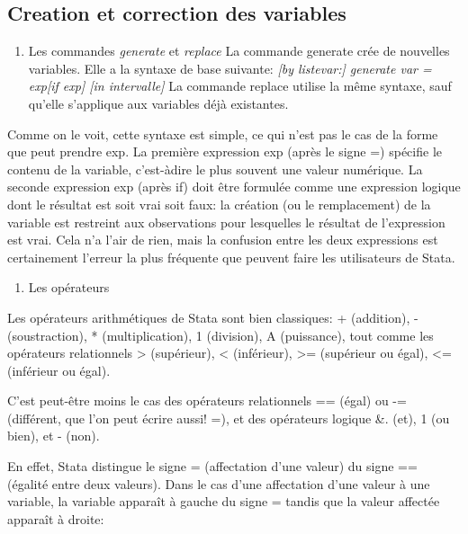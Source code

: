 \documentclass[
]{book}
\providecommand{\tightlist}{%
  \setlength{\itemsep}{0pt}\setlength{\parskip}{0pt}}
\begin{document}
\hypertarget{creation-et-correction-des-variables}{%
\subsection{Creation et correction des variables}\label{creation-et-correction-des-variables}}

\begin{enumerate}
\def\labelenumi{(\arabic{enumi})}
\tightlist
\item
  Les commandes \emph{generate} et \emph{replace}
  La commande generate crée de nouvelles variables. Elle a la syntaxe de base suivante:
  \emph{{[}by listevar:{]} generate var = exp{[}if exp{]} {[}in intervalle{]}}
  La commande replace utilise la même syntaxe, sauf qu'elle s'applique aux variables déjà existantes.
\end{enumerate}

Comme on le voit, cette syntaxe est simple, ce qui n'est pas le cas de la forme que peut prendre exp. La première expression exp (après le signe =) spécifie le contenu de la variable, c'est-àdire le plus souvent une valeur numérique. La seconde expression exp (après if) doit être formulée comme une expression logique dont le résultat est soit vrai soit faux: la création (ou le remplacement) de la variable est restreint aux observations pour lesquelles le résultat de l'expression est vrai. Cela n'a l'air de rien, mais la confusion entre les deux expressions est certainement l'erreur la plus fréquente que peuvent faire les utilisateurs de Stata.

\begin{enumerate}
\def\labelenumi{(\arabic{enumi})}
\setcounter{enumi}{1}
\tightlist
\item
  Les opérateurs
\end{enumerate}

Les opérateurs arithmétiques de Stata sont bien classiques:
+ (addition), - (soustraction), * (multiplication), 1 (division),
A (puissance), tout comme les opérateurs relationnels
\textgreater{} (supérieur), \textless{} (inférieur), \textgreater= (supérieur ou égal), \textless= (inférieur
ou égal).

C'est peut-être moins le cas des opérateurs relationnels == (égal)
ou -= (différent, que l'on peut écrire aussi! =), et des opérateurs
logique \&. (et), 1 (ou bien), et - (non).

En effet, Stata distingue le signe = (affectation d'une valeur) du
signe == (égalité entre deux valeurs). Dans le cas d'une
affectation d'une valeur à une variable, la variable apparaît à
gauche du signe = tandis que la valeur affectée apparaît à droite:
\end{document}
